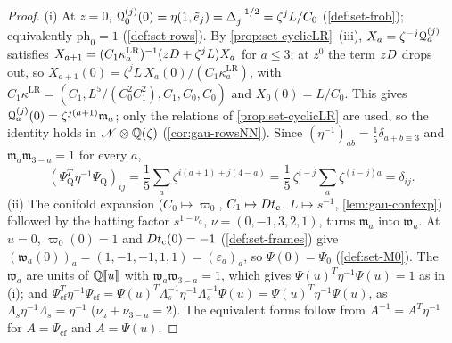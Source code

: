 \begin{proof}
(i) At $z=0$, $\mathcal{Q}^{(j)}_0(0)=\eta(1,\tilde e_j)=\Delta_j^{-1/2}=\zeta^jL/C_0$ (\cref{def:set-frob}); equivalently $\mathrm{ph}_0=1$ (\cref{def:set-rows}). By \cref{prop:set-cyclicLR}~(iii), $X_a=\zeta^{-j}\mathcal{Q}^{(j)}_a$ satisfies $X_{a+1}=(C_1\kappa^{\mathrm{LR}}_a)^{-1}(zD+\zeta^jL)X_a$ for $a\leq3$; at $z^0$ the term $zD$ drops out, so $X_{a+1}(0)=\zeta^jL\,X_a(0)/(C_1\kappa^{\mathrm{LR}}_a)$, with $C_1\kappa^{\mathrm{LR}}=(C_1,L^5/(C_0^2C_1^2),C_1,C_0,C_0)$ and $X_0(0)=L/C_0$. This gives $\mathcal{Q}^{(j)}_a(0)=\zeta^{j(a+1)}\mathfrak m_a$; only the relations of \cref{prop:set-cyclicLR} are used, so the identity holds in $\mathscr{N}\otimes\mathbb{Q}(\zeta)$ (\cref{cor:gau-rowsNN}). Since $(\eta^{-1})_{ab}=\frac15\delta_{a+b\equiv3}$ and $\mathfrak m_a\mathfrak m_{3-a}=1$ for every $a$,
\[
(\Psi_{\mathrm Q}^T\eta^{-1}\Psi_{\mathrm Q})_{ij}=\frac15\sum_a\zeta^{i(a+1)+j(4-a)}=\frac15\,\zeta^{i-j}\sum_a\zeta^{(i-j)a}=\delta_{ij}.
\]
(ii) The conifold expansion ($C_0\mapsto\varpi_0$, $C_1\mapsto Dt_{\mathrm{c}}$, $L\mapsto s^{-1}$, \cref{lem:gau-confexp}) followed by the hatting factor $s^{1-\nu_a}$, $\nu=(0,-1,3,2,1)$, turns $\mathfrak m_a$ into $\mathfrak w_a$. At $u=0$, $\varpi_0(0)=1$ and $Dt_{\mathrm{c}}(0)=-1$ (\cref{def:set-frames}) give $(\mathfrak w_a(0))_a=(1,-1,-1,1,1)=(\varepsilon_a)_a$, so $\Psi(0)=\Psi_0$ (\cref{def:set-M0}). The $\mathfrak w_a$ are units of $\mathbb{Q}[\![ u ]\!]$ with $\mathfrak w_a\mathfrak w_{3-a}=1$, which gives $\Psi(u)^T\eta^{-1}\Psi(u)=1$ as in (i); and $\Psi_{\mathrm{cf}}^T\eta^{-1}\Psi_{\mathrm{cf}}=\Psi(u)^T\Lambda_s^{-1}\eta^{-1}\Lambda_s^{-1}\Psi(u)=\Psi(u)^T\eta^{-1}\Psi(u)$, as $\Lambda_s\eta^{-1}\Lambda_s=\eta^{-1}$ ($\nu_a+\nu_{3-a}=2$). The equivalent forms follow from $A^{-1}=A^T\eta^{-1}$ for $A=\Psi_{\mathrm{cf}}$ and $A=\Psi(u)$.
\end{proof}

